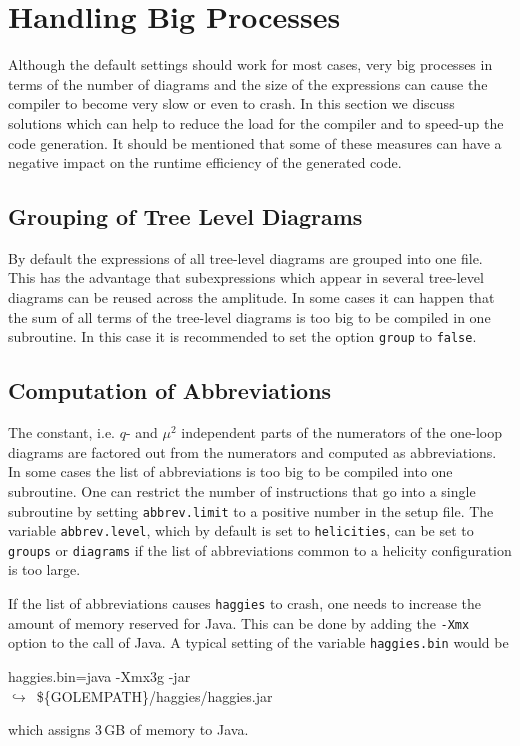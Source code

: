 \documentclass[11pt,a4paper]{refrep}
\newcommand{\haggies}{{\tt haggies}\xspace}
\newcommand{\contl}{{\ensuremath{\hookrightarrow}}}
\begin{document}
\section{Handling Big Processes}
Although the default settings should work for most cases, very big processes
in terms of the number of diagrams and the size of the expressions can cause
the compiler to become very slow or even to crash. In this section we discuss
solutions which can help to reduce the load for the compiler and to speed-up
the code generation. It should be mentioned that some of these measures can
have a negative impact on the runtime efficiency of the generated code.

\subsection{Grouping of Tree Level Diagrams}
By default the expressions of all tree-level diagrams are grouped into one
file. This has the advantage that subexpressions which appear in several
tree-level diagrams can be reused across the amplitude. In some cases
it can happen that the sum of all terms of the tree-level diagrams is too big
to be compiled in one subroutine. In this case it is recommended to set
the option \texttt{group} to \texttt{false}.

\subsection{Computation of Abbreviations}
The constant, i.e. $q$- and $\mu^2$ independent parts of the numerators
of the one-loop diagrams are factored out from the numerators and computed
as abbreviations. In some cases the list of abbreviations is too big to
be compiled into one subroutine. One can restrict the number of instructions
that go into a single subroutine by setting \texttt{abbrev.limit} to a positive
number in the setup file. 
The variable \texttt{abbrev.level}, which by default is set to 
\texttt{helicities}, can be set to \texttt{groups} or 
\texttt{diagrams} if the list of abbreviations common to a helicity configuration 
is too large.

If the list of abbreviations causes \haggies{}
to crash, one needs to increase the amount of memory reserved for Java.
This can be done by adding the \texttt{-Xmx} option to the call of Java.
A typical setting of the variable \texttt{haggies.bin} would be
\begin{example}
haggies.bin=java -Xmx3g -jar \\
\contl\ \$\{GOLEMPATH\}/haggies/haggies.jar
\end{example}
which assigns 3\,GB of memory to Java.
\end{document}
